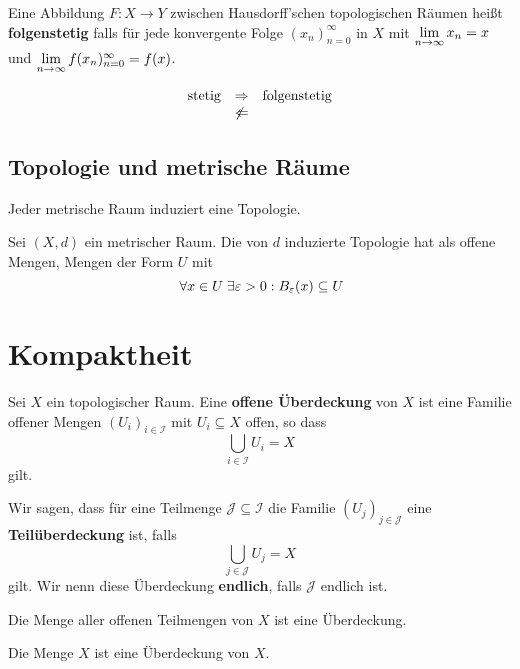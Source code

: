 \documentclass[main.tex]{subfiles}
\begin{document}
\begin{Definition}[Folgenstetigkeit]
  Eine Abbildung $F: X \to Y$ zwischen Hausdorff'schen topologischen Räumen heißt \textbf{folgenstetig} falls für jede konvergente Folge $(x_n)_{n=0}^\infty$ in $X$ mit $\lim \limits_{n \to \infty} x_n = x$ und $\lim \limits_{n \to \infty} f(x_n)_{n=0}^\infty = f(x)$.
\end{Definition}

\begin{Bemerkung}[Warnung]
  $$\begin{array}{c c c}
    \text{stetig} & \Rightarrow & \text{folgenstetig} \\
    & \not\Leftarrow &
  \end{array}$$
\end{Bemerkung}

\subsection{Topologie und metrische Räume}

\begin{Theorem}
  Jeder metrische Raum induziert eine Topologie.
\end{Theorem}

\begin{Beispiel}[Veranschaulichung]
  Sei $(X,d)$ ein metrischer Raum. Die von $d$ induzierte Topologie hat als offene Mengen, Mengen der Form $U$ mit
  $$\;\forall x \in U \;\exists \varepsilon > 0 : B_\varepsilon(x) \subseteq U$$
\end{Beispiel}


\section{Kompaktheit}

\begin{Definition}[Überdeckung]
  Sei $X$ ein topologischer Raum. Eine \textbf{offene Überdeckung} von $X$ ist eine Familie offener Mengen $(U_i)_{i \in \mathcal{I}}$ mit $U_i \subseteq X$ offen, so dass
  $$\bigcup_{i \in \mathcal{I}} U_i = X$$
  gilt.

  Wir sagen, dass für eine Teilmenge $\mathcal{J} \subseteq \mathcal{I}$ die Familie $(U_j)_{j \in \mathcal{J}}$ eine \textbf{Teilüberdeckung} ist, falls
  $$\bigcup_{j \in \mathcal{J}} U_j = X$$
  gilt. Wir nenn diese Überdeckung \textbf{endlich}, falls $\mathcal{J}$ endlich ist.
\end{Definition}

\begin{Beispiel}
  Die Menge aller offenen Teilmengen von $X$ ist eine Überdeckung.

  Die Menge $X$ ist eine Überdeckung von $X$.
\end{Beispiel}
\end{document}
